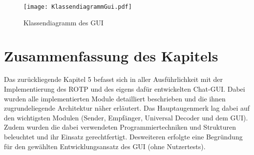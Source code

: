 \begin{figure}[H]
	\centering
	\texttt{[image: KlassendiagrammGui.pdf]}
	\caption{Klassendiagramm des GUI}
	\label{fig:KlassendiagrammGui}
\end{figure}

\section{Zusammenfassung des Kapitels}

Das zur{\"u}ckliegende Kapitel 5 befasst sich in aller Ausf{\"u}hrlichkeit mit
der Implementierung des \gls{ROTP} und des eigens daf{\"u}r entwickelten
Chat-GUI.
Dabei wurden alle implementierten Module detailliert beschrieben und die ihnen
zugrundeliegende Architektur n{\"a}her erl{\"a}utert. Das Hauptaugenmerk lag
dabei auf den wichtigsten Modulen (Sender, Empf{\"a}nger, Universal Decoder
und dem \gls{GUI}). Zudem wurden die dabei verwendeten Programmiertechniken und
Strukturen beleuchtet und ihr Einsatz gerechtfertigt. Desweiteren erfolgte eine
Begr{\"u}ndung f{\"u}r den gew{\"a}hlten Entwicklungsansatz des GUI (ohne
Nutzertests).
